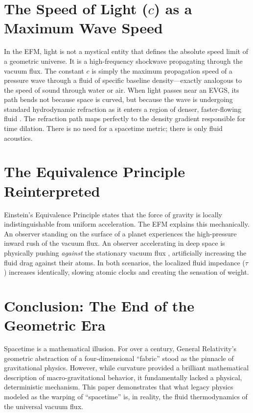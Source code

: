 \documentclass[11pt, a4paper, table]{article}
\begin{document}
\section{The Speed of Light (\texorpdfstring{$c$}{c}) as a Maximum Wave Speed}
  In the EFM, light is not a mystical entity that defines the absolute speed limit of a geometric universe. It is a high-frequency shockwave propagating through the vacuum flux. The constant $c$ is simply the maximum propagation speed of a pressure wave through a fluid of specific baseline density---exactly analogous to the speed of sound through water or air. When light passes near an EVGS, its path bends not because space is curved, but because the wave is undergoing standard hydrodynamic refraction as it enters a region of denser, faster-flowing fluid \cite{marabut2026m3}. The refraction path maps perfectly to the density gradient responsible for time dilation. There is no need for a spacetime metric; there is only fluid acoustics.

\section{The Equivalence Principle Reinterpreted}
  Einstein's Equivalence Principle states that the force of gravity is locally indistinguishable from uniform acceleration. The EFM explains this mechanically. An observer standing on the surface of a planet experiences the high-pressure inward rush of the vacuum flux. An observer accelerating in deep space is physically pushing \textit{against} the stationary vacuum flux \cite{marabut2026m5}, artificially increasing the fluid drag against their atoms. In both scenarios, the localized fluid impedance ($\tau$) increases identically, slowing atomic clocks and creating the sensation of weight.

\section{Conclusion: The End of the Geometric Era}
  Spacetime is a mathematical illusion. For over a century, General Relativity's geometric abstraction of a four-dimensional ``fabric'' stood as the pinnacle of gravitational physics. However, while curvature provided a brilliant mathematical description of macro-gravitational behavior, it fundamentally lacked a physical, deterministic mechanism. This paper demonstrates that what legacy physics modeled as the warping of ``spacetime'' is, in reality, the fluid thermodynamics of the universal vacuum flux.
\end{document}
